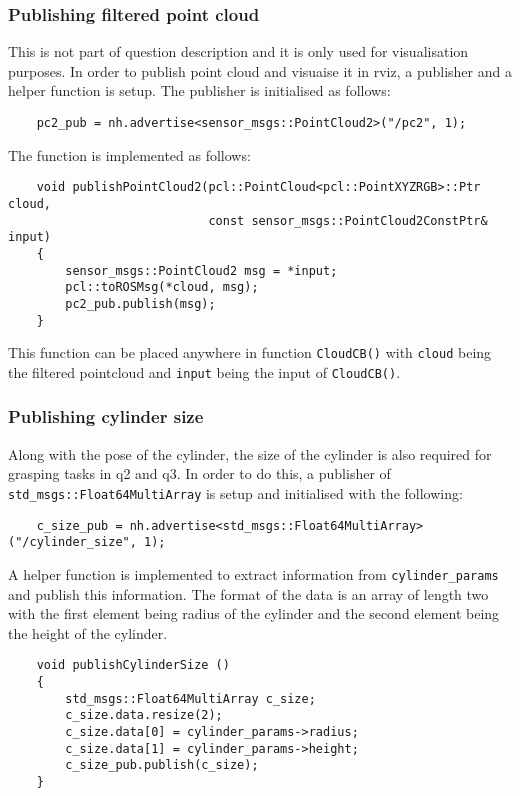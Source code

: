 \documentclass{homework}
\begin{document}
\subsubsection*{Publishing filtered point cloud}
This is not part of question description and it is only used for visualisation purposes. In order to publish point cloud and visuaise it in rviz, a publisher and a helper function is setup. The publisher is initialised as follows:
\begin{verbatim}
    pc2_pub = nh.advertise<sensor_msgs::PointCloud2>("/pc2", 1);
\end{verbatim}
The function is implemented as follows:
\begin{verbatim}
    void publishPointCloud2(pcl::PointCloud<pcl::PointXYZRGB>::Ptr cloud, 
                            const sensor_msgs::PointCloud2ConstPtr& input)
    {
        sensor_msgs::PointCloud2 msg = *input;
        pcl::toROSMsg(*cloud, msg);
        pc2_pub.publish(msg);
    }
\end{verbatim}
This function can be placed anywhere in function \texttt{CloudCB()} with \texttt{cloud} being the filtered pointcloud and \texttt{input} being the input of \texttt{CloudCB()}.

\subsubsection*{Publishing cylinder size}
Along with the pose of the cylinder, the size of the cylinder is also required for grasping tasks in q2 and q3. In order to do this, a publisher of  \texttt{std_msgs::Float64MultiArray} is setup and initialised with the following:
\begin{verbatim}
    c_size_pub = nh.advertise<std_msgs::Float64MultiArray>("/cylinder_size", 1);
\end{verbatim}
A helper function is implemented to extract information from \texttt{cylinder_params} and publish this information. The format of the data is an array of length two with the first element being radius of the cylinder and the second element being the height of the cylinder. 
\begin{verbatim}
    void publishCylinderSize ()
    {
        std_msgs::Float64MultiArray c_size;
        c_size.data.resize(2);
        c_size.data[0] = cylinder_params->radius;
        c_size.data[1] = cylinder_params->height;
        c_size_pub.publish(c_size);
    }
\end{verbatim}
\end{document}
